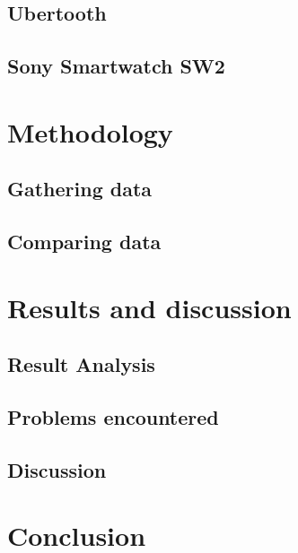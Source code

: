 \documentclass{article}
\begin{document}
	\subsection{Ubertooth}
	\subsection{Sony Smartwatch SW2} %
	
\newpage
\section{Methodology}		%
 
	\subsection{Gathering data} %
	
	\subsection{Comparing data}	%
	
\newpage
\section{Results and discussion}

		\subsection{Result Analysis}
		
		\subsection{Problems encountered}
		
		\subsection{Discussion}
		
\newpage

\section{Conclusion}

\newpage




\vspace*{2\baselineskip} %


{}

\end{document}
